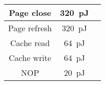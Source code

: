 \begin{table}[h]
{\begin{tabular}{|c|c|c|}
      Page close                      &   \SI[per-mode=symbol]{320}{\pico\joule }     &                                                               \\\hline
      Page refresh                    &   \SI[per-mode=symbol]{320}{\pico\joule }     &                                                               \\\hline
      Cache read                      &   \SI[per-mode=symbol]{ 64}{\pico\joule }     &                                                               \\\hline
      Cache write                     &   \SI[per-mode=symbol]{ 64}{\pico\joule }     &                                                               \\\hline
      NOP                             &   \SI[per-mode=symbol]{ 20}{\pico\joule }     &                                                               \\\hline
    \end{tabular}
    }
  \label{tab:DiRAM4 characteristics}
\end{table}


